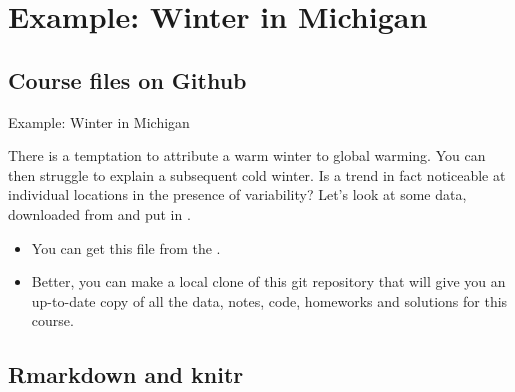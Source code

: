 \section{Example: Winter in Michigan}

\subsection{Course files on Github}

\begin{frame}[fragile]{Example: Winter in Michigan}

There is a temptation to attribute a warm winter to global warming. You can then struggle to explain a subsequent cold winter. Is a trend in fact noticeable at individual locations in the presence of variability? Let's look at some data, downloaded from  and put in . 

\begin{itemize}

\item You can get this file from the .

\item Better, you can make a local clone of this git repository that will give you an up-to-date copy of all the data, notes, code, homeworks and solutions for this course.

\end{itemize}

\begin{knitrout}\small
{}\color{fgcolor}\begin{kframe}
\begin{alltt}
 \hlkwb{<-} \hlstd{(}\hlstd{=}\hlstd{,}\hlstd{=}\hlstd{)}
\end{alltt}
\end{kframe}
\end{knitrout}

\end{frame}

\subsection{Rmarkdown and knitr}

